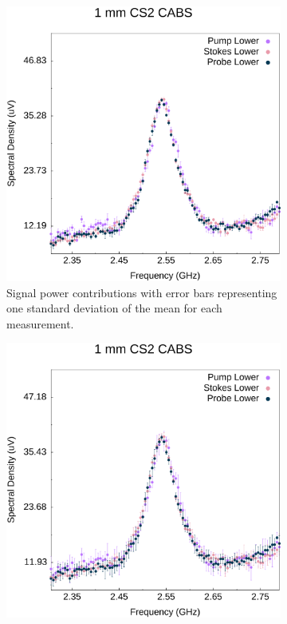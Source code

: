 \documentclass[%
  reprint,
  superscriptaddress,
  amsmath,amssymb,
  aps,
  prapplied,
]{revtex4-2}
\begin{document}
\begin{figure}[h]
  \centering
  \begin{subfigure}{0.45\textwidth}
    \centering
    \includegraphics[width=\textwidth]{PSPr-Contribute-Equally.pdf}
    \caption{Signal power contributions with error bars representing one standard deviation of the mean for each measurement.}
    \label{fig:PSPr-Contribute-Equally}
  \end{subfigure}%
  \hfill
  \begin{subfigure}{0.45\textwidth}
    \centering
    \includegraphics[width=\textwidth]{PSPr-Contribute-Equally-2sigma.pdf}

\end{subfigure}
\end{figure}
\end{document}
